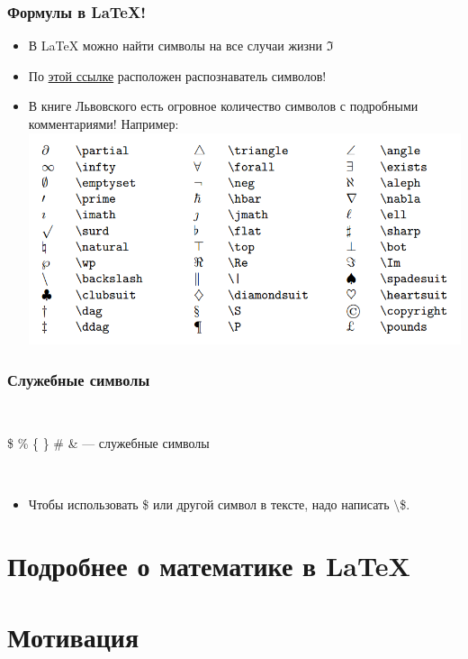 \documentclass[newPxFont]{beamer}
\begin{document}

\begin{frame}
\frametitle{Формулы в \LaTeX!} 
\begin{itemize}
\item В \LaTeX{} можно найти символы на все случаи жизни $\Im$
\item По {\color{blue} \href{http://detexify.kirelabs.org/classify.html}{этой ссылке}} расположен распознаватель символов! \pause
\item В книге Львовского есть огровное количество символов с подробными комментариями! Например: 
\centering  \includegraphics[scale=0.2]{table.png}
\end{itemize}
\end{frame}


\begin{frame}
\frametitle{Служебные символы} 

\mbox{ } 

\centering
\Large{ \$ \% \{ \} \# \& — служебные символы}

\mbox{ }

\begin{itemize}
\item \normalsize{Чтобы использовать \$ или другой символ в тексте, надо написать $\setminus$\$.}
\end{itemize}
\end{frame}


\section{Подробнее о математике в \LaTeX{}} 


\section{Мотивация}
\end{document}
